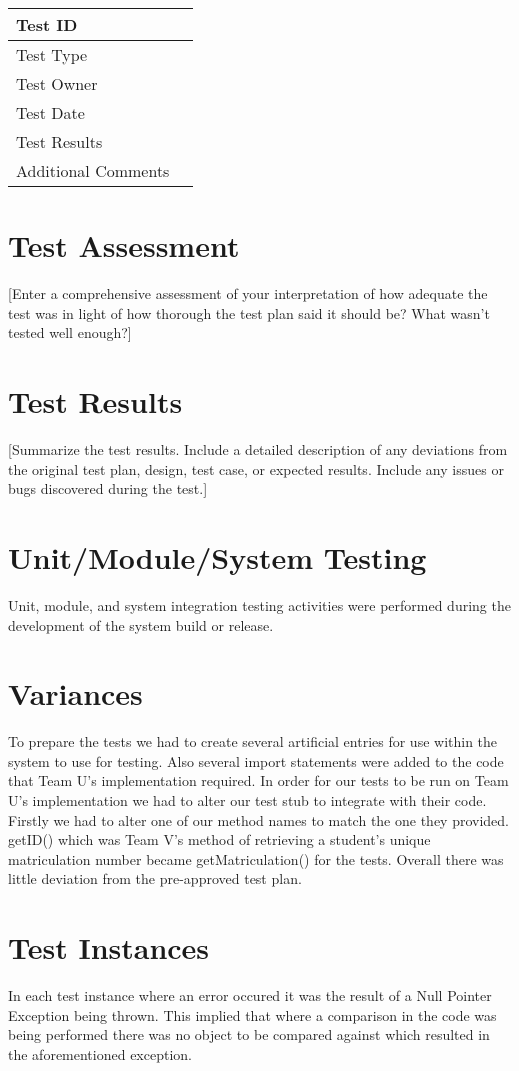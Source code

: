 \documentclass{l3deliverable}
\begin{document}
\begin{tabular}{|l|c|}
\hline
Test ID &\\
\hline
Test Type &\\
\hline
Test Owner  &\\
\hline
Test Date &\\
\hline
Test Results &\\
\hline
Additional Comments &\\
\hline
\end{tabular}

\section{Test Assessment}
[Enter a comprehensive assessment of your interpretation of how adequate the test was in light of how thorough the test plan said it should be? What wasn't tested well enough?]

\section{Test Results}
[Summarize the test results. Include a detailed description of any deviations from the original test plan, design, test case, or expected results. Include any issues or bugs discovered during the test.]

\section{Unit/Module/System Testing}
Unit, module, and system integration testing activities were performed during the development of the system build or release.

\section{Variances}
To prepare the tests we had to create several artificial entries for use within the system to use for testing. Also several import statements were added to the code that Team U's implementation required.
In order for our tests to be run on Team U's implementation we had to alter our test stub to integrate with their code. Firstly we had to alter one of our method names to match the one they provided. getID() which was Team V's method of retrieving a student's unique matriculation number became getMatriculation() for the tests.  
Overall there was little deviation from the pre-approved test plan.

\section{Test Instances}
In each test instance where an error occured it was the result of a Null Pointer Exception being thrown. This implied that where a comparison in the code was being performed there was no object to be compared against which resulted in the aforementioned exception. 
\end{document}

